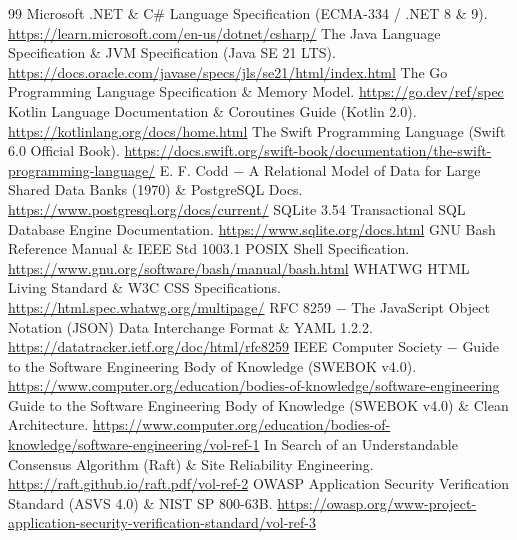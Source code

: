 \documentclass{book}
\begin{document}
\begin{thebibliography}{99}
 Microsoft .NET \& C\# Language Specification (ECMA-334 / .NET 8 \& 9). \url{https://learn.microsoft.com/en-us/dotnet/csharp/}
 The Java Language Specification \& JVM Specification (Java SE 21 LTS). \url{https://docs.oracle.com/javase/specs/jls/se21/html/index.html}
 The Go Programming Language Specification \& Memory Model. \url{https://go.dev/ref/spec}
 Kotlin Language Documentation \& Coroutines Guide (Kotlin 2.0). \url{https://kotlinlang.org/docs/home.html}
 The Swift Programming Language (Swift 6.0 Official Book). \url{https://docs.swift.org/swift-book/documentation/the-swift-programming-language/}
 E. F. Codd \(-\) A Relational Model of Data for Large Shared Data Banks (1970) \& PostgreSQL Docs. \url{https://www.postgresql.org/docs/current/}
 SQLite 3.54 Transactional SQL Database Engine Documentation. \url{https://www.sqlite.org/docs.html}
 GNU Bash Reference Manual \& IEEE Std 1003.1 POSIX Shell Specification. \url{https://www.gnu.org/software/bash/manual/bash.html}
 WHATWG HTML Living Standard \& W3C CSS Specifications. \url{https://html.spec.whatwg.org/multipage/}
 RFC 8259 \(-\) The JavaScript Object Notation (JSON) Data Interchange Format \& YAML 1.2.2. \url{https://datatracker.ietf.org/doc/html/rfc8259}
 IEEE Computer Society \(-\) Guide to the Software Engineering Body of Knowledge (SWEBOK v4.0). \url{https://www.computer.org/education/bodies-of-knowledge/software-engineering}
 Guide to the Software Engineering Body of Knowledge (SWEBOK v4.0) \& Clean Architecture. \url{https://www.computer.org/education/bodies-of-knowledge/software-engineering/vol-ref-1}
 In Search of an Understandable Consensus Algorithm (Raft) \& Site Reliability Engineering. \url{https://raft.github.io/raft.pdf/vol-ref-2}
 OWASP Application Security Verification Standard (ASVS 4.0) \& NIST SP 800-63B. \url{https://owasp.org/www-project-application-security-verification-standard/vol-ref-3}
\end{thebibliography}
\end{document}
